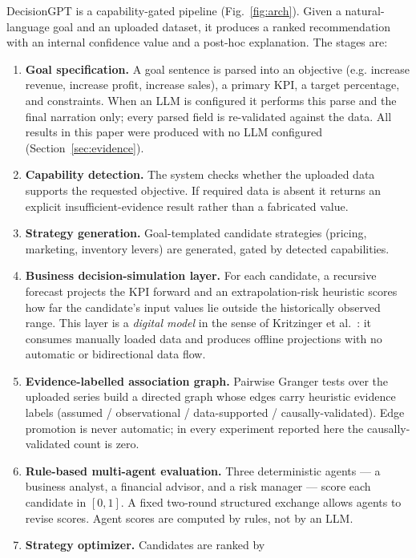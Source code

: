 \documentclass[conference]{IEEEtran}
\begin{document}
DecisionGPT is a capability-gated pipeline (Fig.~\ref{fig:arch}). Given a
natural-language goal and an uploaded dataset, it produces a ranked
recommendation with an internal confidence value and a post-hoc explanation. The
stages are:

\begin{enumerate}
\item \textbf{Goal specification.} A goal sentence is parsed into an objective
(e.g. increase revenue, increase profit, increase sales), a primary KPI, a
target percentage, and constraints. When an LLM is configured it performs this
parse and the final narration only; every parsed field is re-validated against
the data. All results in this paper were produced with no LLM configured
(Section~\ref{sec:evidence}).
\item \textbf{Capability detection.} The system checks whether the uploaded
data supports the requested objective. If required data is absent it returns an
explicit insufficient-evidence result rather than a fabricated value.
\item \textbf{Strategy generation.} Goal-templated candidate strategies
(pricing, marketing, inventory levers) are generated, gated by detected
capabilities.
\item \textbf{Business decision-simulation layer.} For each candidate, a
recursive forecast projects the KPI forward and an extrapolation-risk heuristic
scores how far the candidate's input values lie outside the historically
observed range. This layer is a \emph{digital model} in the sense of Kritzinger
et al.~\cite{Kritzinger2018}: it consumes manually loaded data and produces
offline projections with no automatic or bidirectional data flow.
\item \textbf{Evidence-labelled association graph.} Pairwise Granger tests over
the uploaded series build a directed graph whose edges carry heuristic evidence
labels (assumed / observational / data-supported / causally-validated). Edge
promotion is never automatic; in every experiment reported here the
causally-validated count is zero.
\item \textbf{Rule-based multi-agent evaluation.} Three deterministic agents ---
a business analyst, a financial advisor, and a risk manager --- score each
candidate in $[0,1]$. A fixed two-round structured exchange allows agents to
revise scores. Agent scores are computed by rules, not by an LLM.
\item \textbf{Strategy optimizer.} Candidates are ranked by
\begin{equation}

\end{equation}
\end{enumerate}
\end{document}

